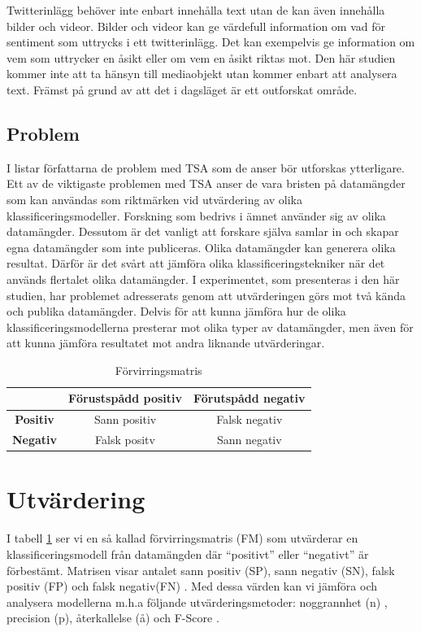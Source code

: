 \documentclass{kaumasters} %
\begin{document}
Twitterinlägg behöver inte enbart innehålla text utan de kan även innehålla bilder och videor. Bilder och videor kan ge värdefull information om vad för sentiment som uttrycks i ett twitterinlägg. Det kan exempelvis ge information om vem som uttrycker en åsikt eller om vem en åsikt riktas mot. Den här studien kommer inte att ta hänsyn till mediaobjekt utan kommer enbart att analysera text. Främst på grund av att det i dagsläget är ett outforskat område.

\subsection{Problem} \label{TSAprob}
I \cite{TSAsurvey} listar författarna de problem med TSA som de anser bör utforskas ytterligare. Ett av de viktigaste problemen med TSA anser de vara bristen på datamängder som kan användas som riktmärken vid utvärdering av olika klassificeringsmodeller. Forskning som bedrivs i ämnet använder sig av olika datamängder. Dessutom är det vanligt att forskare själva samlar in och skapar egna datamängder som inte publiceras. Olika datamängder kan generera olika resultat. Därför är det svårt att jämföra olika klassificeringstekniker när det används flertalet olika datamängder. I experimentet, som presenteras i den här studien, har problemet adresserats genom att utvärderingen görs mot två kända och publika datamängder. Delvis för att kunna jämföra hur de olika klassificeringsmodellerna presterar mot olika typer av datamängder, men även för att kunna jämföra resultatet mot andra liknande utvärderingar.
\begin{table}
\centering
\caption{Förvirringsmatris}
\label{tab:fm}
	\begin{tabular}{ccc}
	\toprule
	 & \textbf{Förustspådd positiv} & \textbf{Förutspådd negativ} \\
	\midrule
	\textbf{Positiv} & Sann positiv & Falsk negativ \\
	\textbf{Negativ} & Falsk positv & Sann negativ \\
	\bottomrule
\end{tabular}
\end{table}

\section{Utvärdering} \label{TSAev}
I tabell \ref{tab:fm} ser vi en så kallad förvirringsmatris (FM) som utvärderar en klassificeringsmodell från datamängden där “positivt” eller “negativt” är förbestämt. Matrisen visar antalet sann positiv (SP), sann negativ (SN), falsk positiv (FP) och falsk negativ(FN) \cite{wiki:003}. Med dessa värden kan vi jämföra och analysera modellerna m.h.a följande utvärderingsmetoder: noggrannhet (n) \cite{wiki:011}, precision (p),  återkallelse (å) \cite{wiki:002} och F-Score \cite{wiki:001}.
\end{document}
